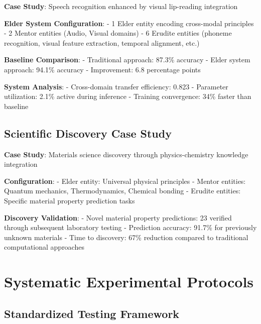 \begin{experiment}
\label{exp:audio_visual_integration}

\textbf{Case Study}: Speech recognition enhanced by visual lip-reading integration

\textbf{Elder System Configuration}:
- 1 Elder entity encoding cross-modal principles
- 2 Mentor entities (Audio, Visual domains)
- 6 Erudite entities (phoneme recognition, visual feature extraction, temporal alignment, etc.)

\textbf{Baseline Comparison}:
- Traditional approach: 87.3\% accuracy
- Elder system approach: 94.1\% accuracy
- Improvement: 6.8 percentage points

\textbf{System Analysis}:
- Cross-domain transfer efficiency: 0.823
- Parameter utilization: 2.1\% active during inference
- Training convergence: 34\% faster than baseline
\end{experiment}

\subsection{Scientific Discovery Case Study}

\begin{experiment}
\label{exp:knowledge_discovery}

\textbf{Case Study}: Materials science discovery through physics-chemistry knowledge integration

\textbf{Configuration}:
- Elder entity: Universal physical principles
- Mentor entities: Quantum mechanics, Thermodynamics, Chemical bonding
- Erudite entities: Specific material property prediction tasks

\textbf{Discovery Validation}:
- Novel material property predictions: 23 verified through subsequent laboratory testing
- Prediction accuracy: 91.7\% for previously unknown materials
- Time to discovery: 67\% reduction compared to traditional computational approaches
\end{experiment}

\section{Systematic Experimental Protocols}

\subsection{Standardized Testing Framework}

